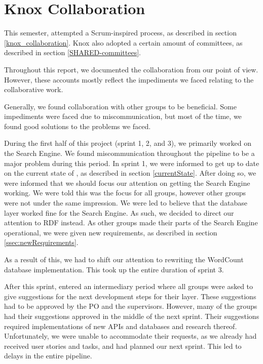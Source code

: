 \section{Knox Collaboration}\label{sec:knoxCollab}
This semester, \knox{} attempted a Scrum-inspired process, as described in section \ref{knox_collaboration}. Knox also adopted a certain amount of committees, as described in section \ref{SHARED-committees}.

Throughout this report, we documented the \knox{} collaboration from our point of view. However, these accounts mostly reflect the impediments we faced relating to the collaborative work.

Generally, we found collaboration with other groups to be beneficial. Some impediments were faced due to miscommunication, but most of the time, we found good solutions to the problems we faced.

During the first half of this project (sprint 1, 2, and 3), we primarily worked on the Search Engine. We found miscommunication throughout the pipeline to be a major problem during this period. In sprint 1, we were informed to get up to date on the current state of \knox{}, as described in section \ref{currentState}. After doing so, we were informed that we should focus our attention on getting the Search Engine working. We were told this was the focus for all groups, however other groups were not under the same impression. We were led to believe that the database layer worked fine for the Search Engine. As such, we decided to direct our attention to RDF instead. As other groups made their parts of the Search Engine operational, we were given new requirements, as described in section \ref{ssec:newRequirements}.

As a result of this, we had to shift our attention to rewriting the WordCount database implementation. This took up the entire duration of sprint 3.

After this sprint, \knox{} entered an intermediary period where all groups were asked to give suggestions for the next development steps for their layer. These suggestions had to be approved by the \knox{} PO and the \knox{} supervisors. However, many of the groups had their suggestions approved in the middle of the next sprint. Their suggestions required implementations of new APIs and databases and research thereof. Unfortunately, we were unable to accommodate their requests, as we already had received user stories and tasks, and had planned our next sprint. This led to delays in the entire pipeline.

